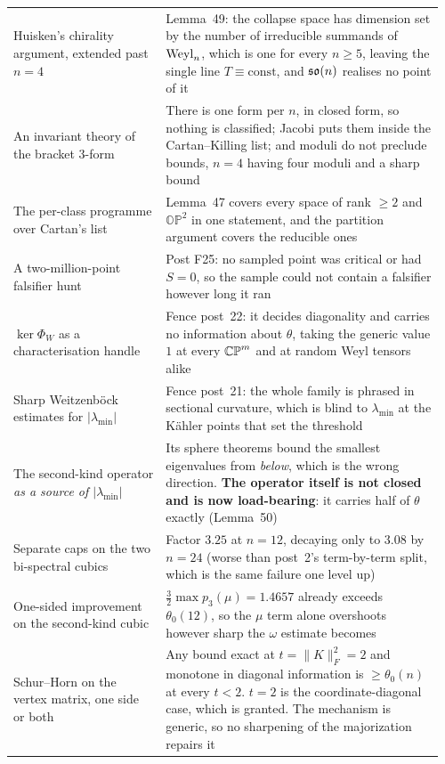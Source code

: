 \begin{longtable}{@{}p{0.34\linewidth}p{0.62\linewidth}@{}}
Huisken's chirality argument, extended past $n=4$ & Lemma~49: the collapse space has dimension set by the number of irreducible summands of $\mathrm{Weyl}_n$, which is one for every $n\ge5$, leaving the single line $T\equiv\text{const}$, and $\mathfrak{so}(n)$ realises no point of it \\
An invariant theory of the bracket $3$-form & There is one form per $n$, in closed form, so nothing is classified; Jacobi puts them inside the Cartan--Killing list; and moduli do not preclude bounds, $n=4$ having four moduli and a sharp bound \\
The per-class programme over Cartan's list & Lemma~47 covers every space of rank $\ge2$ and $\mathbb{OP}^2$ in one statement, and the partition argument covers the reducible ones \\
A two-million-point falsifier hunt & Post F25: no sampled point was critical or had $S=0$, so the sample could not contain a falsifier however long it ran \\
$\ker\Phi_W$ as a characterisation handle & Fence post~22: it decides diagonality and carries no information about $\theta$, taking the generic value $1$ at every $\mathbb{CP}^m$ and at random Weyl tensors alike \\
Sharp Weitzenb\"ock estimates for $|\lambda_{\min}|$ & Fence post~21: the whole family is phrased in sectional curvature, which is blind to $\lambda_{\min}$ at the K\"ahler points that set the threshold \\
The second-kind operator \emph{as a source of $|\lambda_{\min}|$} & Its sphere theorems bound the smallest eigenvalues from \emph{below}, which is the wrong direction. \textbf{The operator itself is not closed and is now load-bearing}: it carries half of $\theta$ exactly (Lemma~50) \\
Separate caps on the two bi-spectral cubics & Factor $3.25$ at $n=12$, decaying only to $3.08$ by $n=24$ (worse than post~2's term-by-term split, which is the same failure one level up) \\
One-sided improvement on the second-kind cubic & $\tfrac32\max p_3(\mu)=1.4657$ already exceeds $\theta_0(12)$, so the $\mu$ term alone overshoots however sharp the $\omega$ estimate becomes \\
Schur--Horn on the vertex matrix, one side or both & Any bound exact at $t=\|K\|_F^2=2$ and monotone in diagonal information is $\ge\theta_0(n)$ at every $t<2$. $t=2$ is the coordinate-diagonal case, which is granted. The mechanism is generic, so no sharpening of the majorization repairs it \\

\end{longtable}

